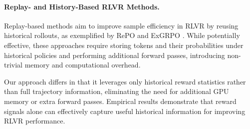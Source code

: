 \paragraph{Replay- and History-Based RLVR Methods.}
Replay-based methods aim to improve sample efficiency in RLVR by reusing historical rollouts, as exemplified by RePO \cite{li2025reporeplayenhancedpolicyoptimization} and ExGRPO \cite{zhan2025exgrpolearningreasonexperience}. 
While potentially effective, these approaches require storing tokens and their probabilities under historical policies and performing additional forward passes, introducing non-trivial memory and computational overhead.

Our approach differs in that it leverages only historical reward statistics rather than full trajectory information, eliminating the need for additional GPU memory or extra forward passes. 
Empirical results demonstrate that reward signals alone can effectively capture useful historical information for improving RLVR performance.
